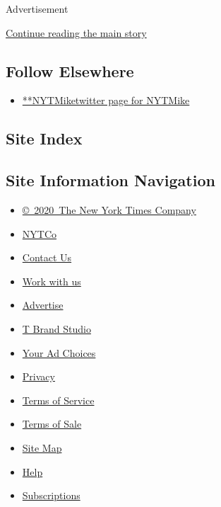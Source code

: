 Advertisement

\protect\hyperlink{after-mid2}{Continue reading the main story}

\hypertarget{follow-elsewhere}{%
\subsection{Follow Elsewhere}\label{follow-elsewhere}}

\begin{itemize}
\tightlist
\item
  \href{https://twitter.com/NYTMike}{**NYTMiketwitter page for NYTMike}
\end{itemize}

\hypertarget{site-index}{%
\subsection{Site Index}\label{site-index}}

\hypertarget{site-information-navigation}{%
\subsection{Site Information
Navigation}\label{site-information-navigation}}

\begin{itemize}
\tightlist
\item
  \href{https://help.nytimes.com/hc/en-us/articles/115014792127-Copyright-notice}{©~2020~The
  New York Times Company}
\end{itemize}

\begin{itemize}
\tightlist
\item
  \href{https://www.nytco.com/}{NYTCo}
\item
  \href{https://help.nytimes.com/hc/en-us/articles/115015385887-Contact-Us}{Contact
  Us}
\item
  \href{https://www.nytco.com/careers/}{Work with us}
\item
  \href{https://nytmediakit.com/}{Advertise}
\item
  \href{http://www.tbrandstudio.com/}{T Brand Studio}
\item
  \href{https://www.nytimes.com/privacy/cookie-policy\#how-do-i-manage-trackers}{Your
  Ad Choices}
\item
  \href{https://www.nytimes.com/privacy}{Privacy}
\item
  \href{https://help.nytimes.com/hc/en-us/articles/115014893428-Terms-of-service}{Terms
  of Service}
\item
  \href{https://help.nytimes.com/hc/en-us/articles/115014893968-Terms-of-sale}{Terms
  of Sale}
\item
  \href{https://spiderbites.nytimes.com}{Site Map}
\item
  \href{https://help.nytimes.com/hc/en-us}{Help}
\item
  \href{https://www.nytimes.com/subscription?campaignId=37WXW}{Subscriptions}
\end{itemize}
